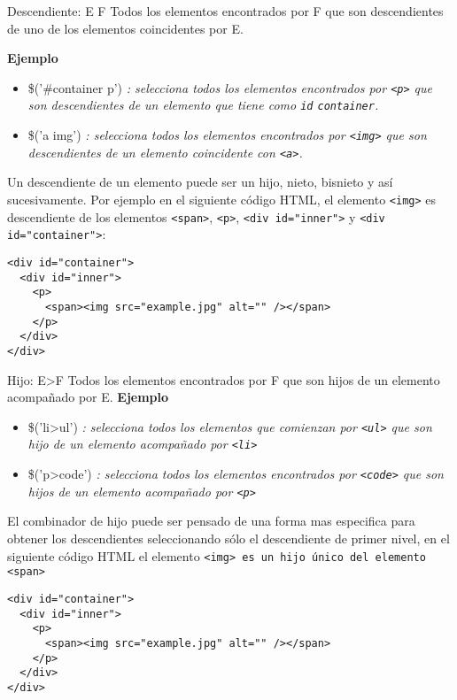 \begin{frame}[fragile]{Descendiente: E F} %
Todos los elementos encontrados por F que son descendientes de uno de los
elementos coincidentes por E.

\textbf{Ejemplo}
\begin{itemize}
    \item \$('\#container p') \textit{: selecciona todos los elementos
    encontrados por \texttt{<p>} que son descendientes de un elemento que tiene
    como \texttt{id} \texttt{container}.}
    \item \$('a img') \textit{: selecciona todos los elementos encontrados por
    \texttt{<img>} que son descendientes de un elemento coincidente con
    \texttt{<a>}.}
\end{itemize}
Un descendiente de un elemento puede ser un hijo, nieto,  bisnieto y así
sucesivamente. Por ejemplo en el siguiente código HTML,  el elemento
\texttt{<img>} es
descendiente de los elementos \texttt{<span>}, \texttt{<p>},  \texttt{<div
id="\/inner"\/>} y
\texttt{<div id="\/container"\/>}:

\begin{lstlisting}
<div id="container">
  <div id="inner">
    <p>
      <span><img src="example.jpg" alt="" /></span>
    </p>
  </div>
</div>
\end{lstlisting}
\end{frame}


\begin{frame}[fragile]{Hijo: E>F} %
Todos los elementos encontrados por F que son hijos de un elemento acompañado
por E.
\textbf{Ejemplo}
\begin{itemize}
    \item \$('li>ul') \textit{: selecciona todos los elementos que comienzan
    por \texttt{<ul>} que son hijo de un elemento acompañado por \texttt{<li>}}
    \item \$('p>code') \textit{: selecciona todos los elementos encontrados por
    \texttt{<code>} que son hijos de un elemento acompañado por \texttt{<p>}}
\end{itemize}
El combinador de hijo puede ser pensado de una forma mas especifica para
obtener los descendientes seleccionando sólo el descendiente de primer nivel,
en el siguiente código HTML el elemento \texttt{<img> es un hijo único del
elemento \texttt{<span>}}
\begin{lstlisting}
<div id="container">
  <div id="inner">
    <p>
      <span><img src="example.jpg" alt="" /></span>
    </p>
  </div>
</div>
\end{lstlisting}
\end{frame}


